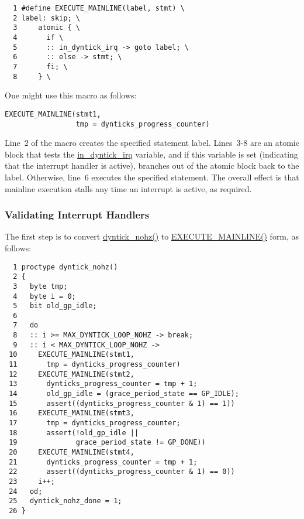 { \scriptsize
\begin{verbatim}
  1 #define EXECUTE_MAINLINE(label, stmt) \
  2 label: skip; \
  3     atomic { \
  4       if \
  5       :: in_dyntick_irq -> goto label; \
  6       :: else -> stmt; \
  7       fi; \
  8     } \
\end{verbatim}
}

One might use this macro as follows:

\vspace{5pt}
\begin{minipage}[t]{\columnwidth}
\scriptsize
\begin{verbatim}
EXECUTE_MAINLINE(stmt1,
                 tmp = dynticks_progress_counter)
\end{verbatim}
\end{minipage}
\vspace{5pt}

Line~2 of the macro creates the specified statement label.
Lines~3-8 are an atomic block that tests the \url{in_dyntick_irq}
variable, and if this variable is set (indicating that the interrupt
handler is active), branches out of the atomic block back to the
label.
Otherwise, line~6 executes the specified statement.
The overall effect is that mainline execution stalls any time an interrupt
is active, as required.

\subsubsection{Validating Interrupt Handlers}
\label{app:formal:Validating Interrupt Handlers}

The first step is to convert \url{dyntick_nohz()} to
\url{EXECUTE_MAINLINE()} form, as follows:

{ \scriptsize
\begin{verbatim}
  1 proctype dyntick_nohz()
  2 {
  3   byte tmp;
  4   byte i = 0;
  5   bit old_gp_idle;
  6 
  7   do
  8   :: i >= MAX_DYNTICK_LOOP_NOHZ -> break;
  9   :: i < MAX_DYNTICK_LOOP_NOHZ ->
 10     EXECUTE_MAINLINE(stmt1,
 11       tmp = dynticks_progress_counter)
 12     EXECUTE_MAINLINE(stmt2,
 13       dynticks_progress_counter = tmp + 1;
 14       old_gp_idle = (grace_period_state == GP_IDLE);
 15       assert((dynticks_progress_counter & 1) == 1))
 16     EXECUTE_MAINLINE(stmt3,
 17       tmp = dynticks_progress_counter;
 18       assert(!old_gp_idle ||
 19              grace_period_state != GP_DONE))
 20     EXECUTE_MAINLINE(stmt4,
 21       dynticks_progress_counter = tmp + 1;
 22       assert((dynticks_progress_counter & 1) == 0))
 23     i++;
 24   od;
 25   dyntick_nohz_done = 1;
 26 }
\end{verbatim}
}

